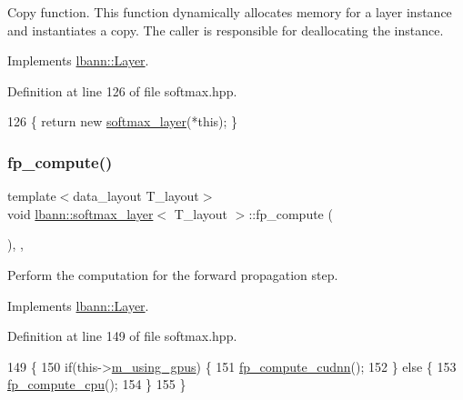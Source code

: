 Copy function. This function dynamically allocates memory for a layer instance and instantiates a copy. The caller is responsible for deallocating the instance. 

Implements \hyperlink{classlbann_1_1Layer_af420f22bbac801c85483ade84588a23f}{lbann\+::\+Layer}.



Definition at line 126 of file softmax.\+hpp.


\begin{DoxyCode}
126 \{ \textcolor{keywordflow}{return} \textcolor{keyword}{new} \hyperlink{classlbann_1_1softmax__layer_aeac8e8c98c838929afc9ab6c82af24d2}{softmax\_layer}(*\textcolor{keyword}{this}); \}
\end{DoxyCode}
\mbox{\label{classlbann_1_1softmax__layer_a15d05369ebef618edcf34d4679aaf2fc}} 
\subsubsection{\texorpdfstring{fp\+\_\+compute()}{fp\_compute()}}
{\footnotesize\ttfamily template$<$data\+\_\+layout T\+\_\+layout$>$ \\
void \hyperlink{classlbann_1_1softmax__layer}{lbann\+::softmax\+\_\+layer}$<$ T\+\_\+layout $>$\+::fp\+\_\+compute (\begin{DoxyParamCaption}{ }\end{DoxyParamCaption})\hspace{0.3cm}{\ttfamily [inline]}, {\ttfamily [override]}, {\ttfamily [virtual]}}

Perform the computation for the forward propagation step. 

Implements \hyperlink{classlbann_1_1Layer_a523319dd1bd87a0612afa1912bb5aad7}{lbann\+::\+Layer}.



Definition at line 149 of file softmax.\+hpp.


\begin{DoxyCode}
149                              \{
150     \textcolor{keywordflow}{if}(this->\hyperlink{classlbann_1_1Layer_af7881cb5eff5207c15fa835d65462e8f}{m\_using\_gpus}) \{
151       \hyperlink{classlbann_1_1softmax__layer_a5f2e55d32c4042e5da736b6eb5553e82}{fp\_compute\_cudnn}();
152     \} \textcolor{keywordflow}{else} \{
153       \hyperlink{classlbann_1_1softmax__layer_ae781c249eccf05c670395cc94ad58bc4}{fp\_compute\_cpu}();
154     \}
155   \}
\end{DoxyCode}
\mbox{\label{classlbann_1_1softmax__layer_ae781c249eccf05c670395cc94ad58bc4}} 
